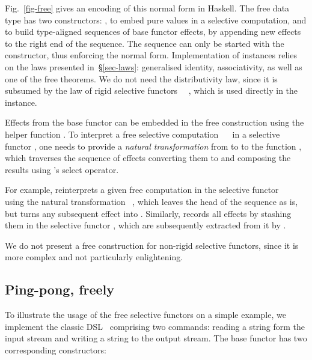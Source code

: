 Fig.~\ref{fig-free} gives an encoding of this normal form in Haskell. The free
data type  has two constructors: , to embed pure values in
a selective computation, and  to build type-aligned sequences of
base functor effects, by appending new effects to the right end of the sequence.
The sequence can only be started with the  constructor, thus enforcing
the normal form. Implementation of instances relies on the laws presented
in~\S\ref{sec-laws}: generalised identity, associativity, as well as one of the
free theorems. We do not need the distributivity law, since it is subsumed by
the law of rigid selective functors \hs{(<*>)}~\hs{=}~, which is used
directly in the  instance.

Effects from the base functor can be embedded in the free construction using
the helper function . To interpret a free selective computation
~~ in a selective functor , one needs to provide
a \emph{natural transformation} from  to  to the function
, which traverses the sequence of effects converting them to
 and composing the results using 's select operator.

For example,  reinterprets a given free computation in the selective
functor ~\hs{=}~ using the natural transformation
~, which leaves the  head of the sequence as is,
but turns any subsequent effect into . Similarly, 
records all effects by stashing them in the selective functor , which
are subsequently extracted from it by .

We do not present a free construction for non-rigid selective functors, since it
is more complex and not particularly enlightening.

\subsection{Ping-pong, freely}\label{sec-free-ping-pong}

To illustrate the usage of the free selective functors on a simple example,
we implement the classic  DSL~\cite{swierstra2008data} comprising
two commands: reading a string form the input stream and writing a string to the
output stream. The base functor has two corresponding constructors:

